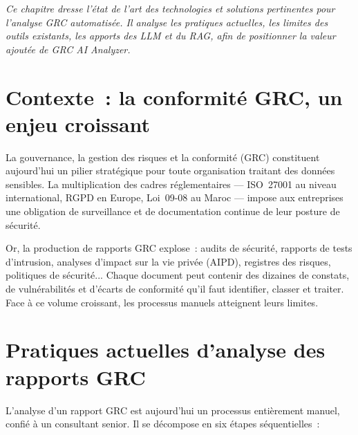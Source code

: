 \documentclass[a4paper,12pt,oneside]{report}
\begin{document}
	\begin{tcolorbox}[infobox]
		\itshape Ce chapitre dresse l'\'etat de l'art des technologies et solutions
		pertinentes pour l'analyse GRC automatis\'ee. Il analyse les pratiques actuelles,
		les limites des outils existants, les apports des LLM et du RAG, afin de
		positionner la valeur ajout\'ee de GRC AI Analyzer.
	\end{tcolorbox}
	
	\section{Contexte~: la conformit\'e GRC, un enjeu croissant}
	
	La gouvernance, la gestion des risques et la conformit\'e (GRC) constituent
	aujourd'hui un pilier strat\'egique pour toute organisation traitant des
	donn\'ees sensibles. La multiplication des cadres r\'eglementaires ---
	ISO~27001 au niveau international, RGPD en Europe, Loi~09-08 au Maroc ---
	impose aux entreprises une obligation de surveillance et de documentation
	continue de leur posture de s\'ecurit\'e.
	
	Or, la production de rapports GRC explose~: audits de s\'ecurit\'e,
	rapports de tests d'intrusion, analyses d'impact sur la vie priv\'ee (AIPD),
	registres des risques, politiques de s\'ecurit\'e... Chaque document peut
	contenir des dizaines de constats, de vuln\'erabilit\'es et d'\'ecarts de
	conformit\'e qu'il faut identifier, classer et traiter. Face \`a ce volume
	croissant, les processus manuels atteignent leurs limites.
	
	\section{Pratiques actuelles d'analyse des rapports GRC}
	
	L'analyse d'un rapport GRC est aujourd'hui un processus enti\`erement manuel,
	confié \`a un consultant senior. Il se d\'ecompose en six \'etapes s\'equentielles~:
	
\end{document}
